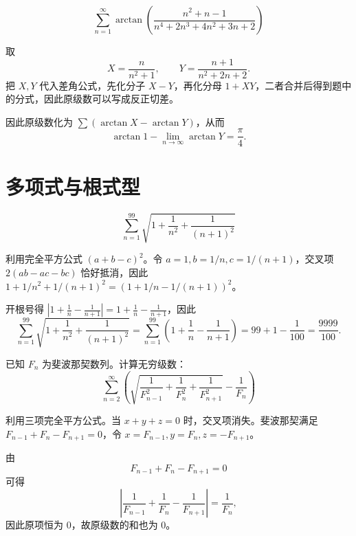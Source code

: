\begin{example}[$ \sum_{n=1}^{\infty} \arctan \left( \frac{n^2+n-1}{n^4+2n^3+4n^2+3n+2} \right) $]
    $$ \sum_{n=1}^{\infty} \arctan \left( \frac{n^2+n-1}{n^4+2n^3+4n^2+3n+2} \right) $$
\end{example}
\begin{solution}
取
\[
X=\frac{n}{n^2+1},\qquad Y=\frac{n+1}{n^2+2n+2}.
\]
把 \(X,Y\) 代入差角公式，先化分子 \(X-Y\)，再化分母 \(1+XY\)，二者合并后得到题中的分式，因此原级数可以写成反正切差。

因此原级数化为 \(\sum (\arctan X - \arctan Y)\)，从而
\[
\arctan 1 - \lim_{n\to\infty} \arctan Y = \frac{\pi}{4}.
\]
\end{solution}

\section{多项式与根式型}

\begin{example}[$\displaystyle \sum_{n=1}^{99} \sqrt{1 + \frac{1}{n^2} + \frac{1}{(n+1)^2}}$]
    $$\displaystyle \sum_{n=1}^{99} \sqrt{1 + \frac{1}{n^2} + \frac{1}{(n+1)^2}}$$
\end{example}
\begin{solution}
利用完全平方公式 \((a+b-c)^2\)。令 \( a=1, b=1/n, c=1/(n+1) \)，交叉项 \( 2(ab-ac-bc) \) 恰好抵消，因此 \( 1 + 1/n^2 + 1/(n+1)^2 = (1 + 1/n - 1/(n+1))^2 \)。

开根号得 \( \left|1 + \frac{1}{n} - \frac{1}{n+1}\right| = 1 + \frac{1}{n} - \frac{1}{n+1} \)，因此
\[
\sum_{n=1}^{99} \sqrt{1 + \frac{1}{n^2} + \frac{1}{(n+1)^2}}
= \sum_{n=1}^{99} \left(1 + \frac{1}{n} - \frac{1}{n+1}\right)
= 99 + 1 - \frac{1}{100}
= \frac{9999}{100}.
\]
\end{solution}

\begin{example}[$ \sum_{n=2}^{\infty} \left( \sqrt{ \frac{1}{F_{n-1}^2} + \frac{1}{F_n^2} + \frac{1}{F_{n+1}^2} } - \frac{1}{F_n} \right) $]
已知 \( F_n \) 为斐波那契数列。计算无穷级数：$$ \sum_{n=2}^{\infty} \left( \sqrt{ \frac{1}{F_{n-1}^2} + \frac{1}{F_n^2} + \frac{1}{F_{n+1}^2} } - \frac{1}{F_n} \right) $$
\end{example}
\begin{solution}
利用三项完全平方公式。当 \( x+y+z=0 \) 时，交叉项消失。斐波那契满足 \( F_{n-1} + F_n - F_{n+1} = 0 \)，令 \( x=F_{n-1}, y=F_n, z=-F_{n+1} \)。

由
\[
F_{n-1}+F_n-F_{n+1}=0
\]
可得
\[
\left|\frac{1}{F_{n-1}}+\frac{1}{F_n}-\frac{1}{F_{n+1}}\right|=\frac{1}{F_n},
\]
因此原项恒为 \(0\)，故原级数的和也为 \(0\)。
\end{solution}

